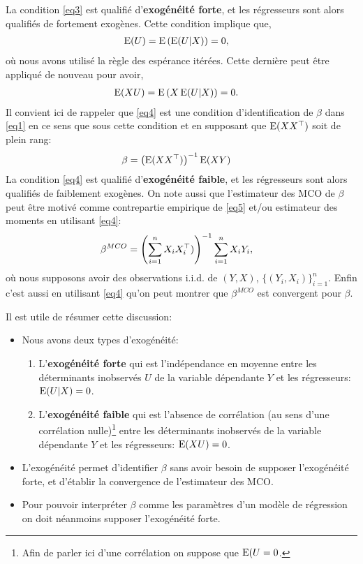 La condition \eqref{eq3} est qualifié d'\textbf{exogénéité forte}, et les régresseurs sont alors qualifiés de fortement exogènes. 
Cette condition implique que, 
\begin{align*}
	\operatorname{E}(U) &= \operatorname{E}\left(\operatorname{E}(U|X)\right) = 0,
\end{align*}
où nous avons utilisé la règle des espérance itérées. Cette dernière peut être appliqué de nouveau pour avoir,
\begin{align}
	\operatorname{E}(XU) &= \operatorname{E}\left(X\operatorname{E}(U|X)\right) = 0.
	\label{eq4}
\end{align}
Il convient ici de rappeler que \eqref{eq4} est une condition d'identification de $\beta$ dans \eqref{eq1} en ce sens que
sous cette condition et en supposant que $\operatorname{E}(XX^\top)$ soit de plein rang:
\begin{align}
\beta &=\left(\operatorname{E}(XX^\top)\right)^{-1}\operatorname{E}(XY)
\label{eq5}
\end{align}
La condition \eqref{eq4} est qualifié d'\textbf{exogénéité faible}, et les régresseurs sont alors qualifiés de faiblement exogènes. 
On note aussi que l'estimateur des MCO de $\beta$ peut être motivé comme contrepartie empirique de \eqref{eq5} et/ou
estimateur des moments en utilisant \eqref{eq4}:
\begin{align}
	\beta^{MCO} &=\left(\sum_{i=1}^n X_iX_i^\top)\right)^{-1}\sum_{i=1}^n X_iY_i,
	\label{eq6}
\end{align}
où nous supposons avoir des observations i.i.d. de $(Y, X)$, $\{(Y_i, X_i)\}_{i=1}^n$. Enfin c'est aussi en 
utilisant  \eqref{eq4} qu'on peut montrer que $\beta^{MCO}$ est convergent pour $\beta$.

Il est utile de résumer cette discussion:
\begin{itemize}[label = -]
	\item Nous avons deux types d'exogénéité: 
	\begin{enumerate}
		\item L'\textbf{exogénéité forte} qui est l'indépendance en moyenne entre les déterminants inobservés 
		$U$ de la variable dépendante $Y$ et les régresseurs: $\operatorname{E}(U|X) = 0$.
		\item L'\textbf{exogénéité faible} qui est l'absence de corrélation
		(au sens d'une corrélation nulle)\footnote{Afin de parler ici d'une corrélation on suppose que $\operatorname{E}(U=0$.} 
		entre les déterminants inobservés de la variable dépendante $Y$ et les régresseurs: $\operatorname{E}(XU) = 0$.
	\end{enumerate}
	\item L'exogénéité permet d'identifier $\beta$ sans avoir besoin de supposer l'exogénéité forte, et
	 d'établir la convergence de l'estimateur des MCO.
	 \item Pour pouvoir interpréter $\beta$ comme les paramètres d'un modèle de régression on doit 
	 néanmoins supposer l'exogénéité forte.
\end{itemize}


